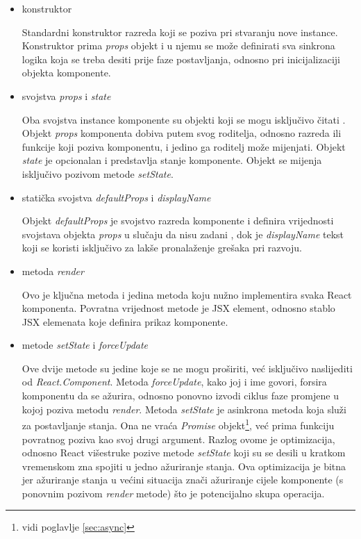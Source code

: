 \documentclass[times, utf8, diplomski, numeric]{fer}
\begin{document}
\begin{itemize}

    \item konstruktor
    
    Standardni konstruktor razreda koji se poziva pri stvaranju nove instance. Konstruktor prima \emph{props} objekt i u njemu se može definirati sva sinkrona logika koja se treba desiti prije faze postavljanja, odnosno pri inicijalizaciji objekta komponente.

    \item svojstva \emph{props} i \emph{state}
    
    Oba svojstva instance komponente su objekti koji se mogu isključivo čitati .
    Objekt \emph{props} komponenta dobiva putem svog roditelja, odnosno razreda ili funkcije koji poziva komponentu, i jedino ga roditelj može mijenjati.
    Objekt \emph{state} je opcionalan i predstavlja stanje komponente. Objekt se mijenja isključivo pozivom metode \emph{setState}.

    \item statička svojstva \emph{defaultProps} i \emph{displayName}
    
    Objekt \emph{defaultProps} je svojstvo razreda komponente i definira vrijednosti svojstava objekta \emph{props} u slučaju da nisu zadani , dok je \emph{displayName} tekst koji se koristi isključivo za lakše pronalaženje grešaka pri razvoju.

    \item metoda \emph{render}
    
    Ovo je ključna metoda i jedina metoda koju nužno implementira svaka React komponenta. Povratna vrijednost metode je JSX element, odnosno stablo JSX elemenata koje definira prikaz komponente.

    \item metode \emph{setState} i \emph{forceUpdate}
    
    Ove dvije metode su jedine koje se ne mogu proširiti, već isključivo naslijediti od \emph{React.Component}.
    Metoda \emph{forceUpdate}, kako joj i ime govori, forsira komponentu da se ažurira, odnosno ponovno izvodi ciklus faze promjene u kojoj poziva metodu \emph{render}.
    Metoda \emph{setState} je asinkrona metoda koja služi za postavljanje stanja.
    Ona ne vraća \emph{Promise} objekt\footnote{vidi poglavlje \ref{sec:async}}, već prima funkciju povratnog poziva kao svoj drugi argument.
    Razlog ovome je optimizacija, odnosno React višestruke pozive metode \emph{setState} koji su se desili u kratkom vremenskom zna spojiti u jedno ažuriranje stanja.
    Ova optimizacija je bitna jer ažuriranje stanja u većini situacija znači ažuriranje cijele komponente (s ponovnim pozivom \emph{render} metode) što je potencijalno skupa operacija.


\end{itemize}
\end{document}
